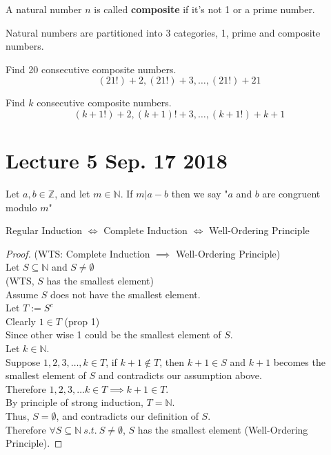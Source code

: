 \documentclass[10pt]{article}
\begin{document}
	\begin{definition}
		A natural number $n$ is called \textbf{composite} if it's not 1 or a prime number.
	\end{definition}
	
	\begin{remark}
		Natural numbers are partitioned into 3 categories, 1, prime and composite numbers.
	\end{remark}
	
	\begin{example}
		Find 20 consecutive composite numbers.
		\[
		(21!)+2, (21!)+3, \dots, (21!)+21
		\]
	\end{example}
	
	\begin{example}
		Find $k$ consecutive composite numbers.
		\[
			(k+1!)+2, (k+1)!+3, \dots ,(k+1!)+k+1
		\]
	\end{example}
	
	\section{Lecture 5 Sep. 17 2018}
	
	\begin{definition}
		Let $a, b \in \mathbb{Z}$, and let $m \in \mathbb{N}$. If $m | a - b$ then we say "$a$ and $b$ are congruent modulo $m$"
	\end{definition}
	
	\begin{remark}
		Regular Induction $\iff$ Complete Induction $\iff$ Well-Ordering Principle
	\end{remark}
	
	\begin{proof}
		(WTS: Complete Induction $\implies$ Well-Ordering Principle) \\
		Let $S \subseteq \mathbb{N}$ and $S \neq \emptyset$ \\
		(WTS, $S$ has the smallest element) \\
		Assume $S$ does not have the smallest element. \\
		Let $T := S^c$ \\
		Clearly $1 \in T$ (prop 1) \\
		Since other wise 1 could be the smallest element of $S$. \\
		Let $k \in \mathbb{N}$. \\
		Suppose $1, 2, 3, \dots, k \in T$, if $k+1 \notin T$, then $k+1 \in S$ and $k+1$ becomes the smallest element of $S$ and contradicts our assumption above. \\
		Therefore $1, 2, 3, \dots k \in T \implies k+1 \in T$.\\ 
		By principle of strong induction, $T = \mathbb{N}$. \\
		Thus, $S = \emptyset$, and contradicts our definition of $S$. \\
		Therefore $\forall S \subseteq \mathbb{N}\ s.t.\ S \neq \emptyset$, $S$ has the smallest element (Well-Ordering Principle). 
	\end{proof}
	
\end{document}
